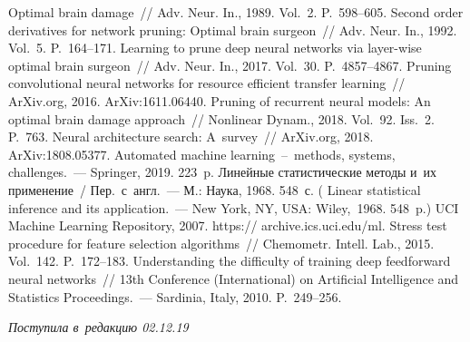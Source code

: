 \begin{multicols}{2}
{{\begin{thebibliography}{99}
 Optimal brain damage~// Adv. Neur. In., 1989. Vol.~2. P.~598--605.
 Second order derivatives for 
network pruning: Optimal brain surgeon~// Adv. Neur. In., 1992. Vol.~5. P.~164--171.
 Learning to prune deep neural 
networks via layer-wise optimal brain surgeon~// Adv. Neur. 
In., 2017.  Vol.~30. P.~4857--4867.
Pruning convolutional neural networks for resource efficient transfer
learning~// ArXiv.org, 2016. ArXiv:1611.06440.
 Pruning of recurrent neural 
models: An optimal brain damage approach~// Nonlinear Dynam., 2018. 
Vol.~92. Iss.~2. P.~763.
 Neural 
architecture search: A~survey~// ArXiv.org, 2018. ArXiv:1808.05377.
 Automated 
machine learning~--~methods, systems, challenges.~--- Springer, 2019. 223~p.
 Линейные статистические методы и~их 
применение~/ Пер.~с~англ.~--- М.: Наука, 1968. 548~с. ( Linear 
statistical inference and its application.~--- New York, NY, USA: 
Wiley,~1968. 548~p.)
UCI Machine Learning Repository, 2007. {\sf 
https:// archive.ics.uci.edu/ml}.
 Stress test procedure for 
feature selection algorithms~// Chemometr. Intell. Lab., 2015. Vol.~142. P.~172--183.
  Understanding the difficulty of 
training deep feedforward neural networks~// 13th Conference (International) 
on Artificial Intelligence and Statistics Proceedings.~--- Sardinia, 
Italy, 2010. P.~249--256.
\end{thebibliography}

 }
 }

\end{multicols}

\vspace*{-6pt}

\hfill{\small\textit{Поступила в~редакцию 02.12.19}}



\newpage

\vspace*{-28pt}

